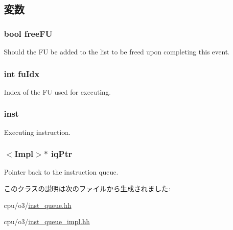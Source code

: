 \subsection{変数}
\hypertarget{classInstructionQueue_1_1FUCompletion_a535ed82ab8098d4da414bfa62e95867d}{
\subsubsection[{freeFU}]{\setlength{\rightskip}{0pt plus 5cm}bool {\bf freeFU}}}
\label{classInstructionQueue_1_1FUCompletion_a535ed82ab8098d4da414bfa62e95867d}
Should the FU be added to the list to be freed upon completing this event. \hypertarget{classInstructionQueue_1_1FUCompletion_ae76a7e2adfb158874f48a23c71690db3}{
\subsubsection[{fuIdx}]{\setlength{\rightskip}{0pt plus 5cm}int {\bf fuIdx}}}
\label{classInstructionQueue_1_1FUCompletion_ae76a7e2adfb158874f48a23c71690db3}
Index of the FU used for executing. \hypertarget{classInstructionQueue_1_1FUCompletion_af5d4fb974eeb4507d4c837d365d0cefc}{
\subsubsection[{inst}]{ {\bf inst}}}
\label{classInstructionQueue_1_1FUCompletion_af5d4fb974eeb4507d4c837d365d0cefc}
Executing instruction. \hypertarget{classInstructionQueue_1_1FUCompletion_ae1fd26993119273f381c42894e2672c6}{
\subsubsection[{iqPtr}]{$<$Impl$>$$\ast$ {\bf iqPtr}}}
\label{classInstructionQueue_1_1FUCompletion_ae1fd26993119273f381c42894e2672c6}
Pointer back to the instruction queue. 

このクラスの説明は次のファイルから生成されました:\begin{DoxyCompactItemize}
\item 
cpu/o3/\hyperlink{o3_2inst__queue_8hh}{inst\_\-queue.hh}\item 
cpu/o3/\hyperlink{o3_2inst__queue__impl_8hh}{inst\_\-queue\_\-impl.hh}\end{DoxyCompactItemize}
